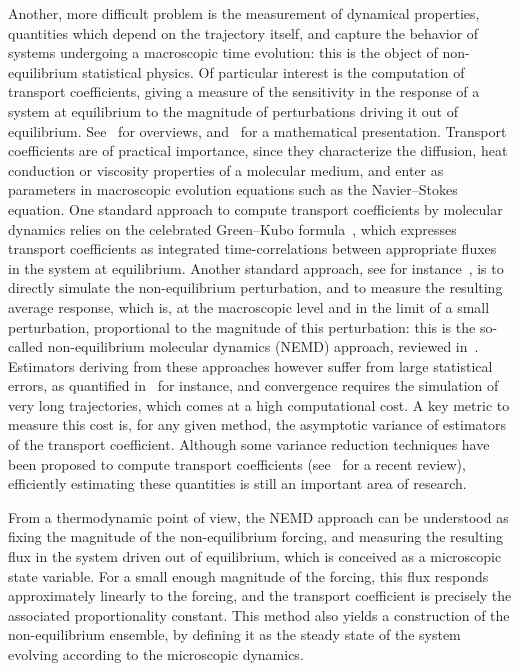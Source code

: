 Another, more difficult problem is the measurement of dynamical properties, quantities which depend on the trajectory itself, and capture the behavior of systems undergoing a macroscopic time evolution: this is the object of non-equilibrium statistical physics.
Of particular interest is the computation of transport coefficients, giving a measure of the sensitivity in the response of a system at equilibrium to the magnitude of perturbations driving it out of equilibrium. See~\cite{EM08,TD17} for overviews, and~\cite[Section 5]{LS16} for a mathematical presentation.
Transport coefficients are of practical importance, since they characterize the diffusion, heat conduction or viscosity properties of a molecular medium, and enter as parameters in macroscopic evolution equations such as the Navier--Stokes equation.
One standard approach to compute transport coefficients by molecular dynamics relies on the celebrated Green--Kubo formula~\cite{G54}, which expresses transport coefficients as integrated time-correlations between appropriate fluxes in the system at equilibrium. Another standard approach, see for instance~\cite{CJ75}, is to directly simulate the non-equilibrium perturbation, and to measure the resulting average response, which is, at the macroscopic level and in the limit of a small perturbation, proportional to the magnitude of this perturbation: this is the so-called non-equilibrium molecular dynamics (NEMD) approach, reviewed in~\cite{CKS05}. Estimators deriving from these approaches however suffer from large statistical errors, as quantified in~\cite[Proposition 2.4]{SS23} for instance, and convergence requires the simulation of very long trajectories, which comes at a high computational cost. A key metric to measure this cost is, for any given method, the asymptotic variance of estimators of the transport coefficient. Although some variance reduction techniques have been proposed to compute transport coefficients (see~\cite{S24} for a recent review), efficiently estimating these quantities is still an important area of research.

From a thermodynamic point of view, the NEMD approach can be understood as fixing the magnitude of the non-equilibrium forcing, and measuring the resulting flux in the system driven out of equilibrium, which is conceived as a microscopic state variable. For a small enough magnitude of the forcing, this flux responds approximately linearly to the forcing, and the transport coefficient is precisely the associated proportionality constant. This method also yields a construction of the non-equilibrium ensemble, by defining it as the steady state of the system evolving according to the microscopic dynamics.

